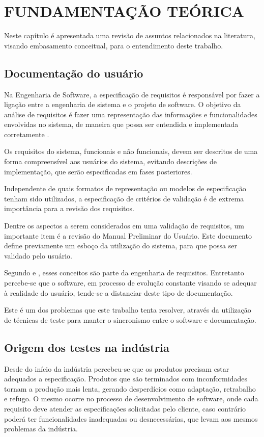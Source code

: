 \chapter{FUNDAMENTAÇÃO TEÓRICA}

Neste capítulo é apresentada uma revisão de assuntos relacionados na literatura, visando embasamento conceitual, para o entendimento deste trabalho.


\section{Documentação do usuário}

Na Engenharia de Software, a especificação de requisitos é responsável por fazer a ligação entre a engenharia de sistema e o projeto de software. O objetivo da análise de requisitos é fazer uma representação das informações e funcionalidades envolvidas no sistema, de maneira que possa ser entendida e implementada corretamente \cite{PRESSMAN}.

Os requisitos do sistema, funcionais e não funcionais, devem ser descritos de uma forma compreensível aos usuários do sistema, evitando descrições de implementação, que serão especificadas em fases posteriores.

Independente de quais formatos de representação ou modelos de especificação tenham sido utilizados, a especificação de critérios de validação é de extrema importância para a revisão dos requisitos.

Dentre os aspectos a serem considerados em uma validação de requisitos, um importante item é a revisão do Manual Preliminar do Usuário. Este documento define previamente um esboço da utilização do sistema, para que possa ser validado pelo usuário.

Segundo  e , esses conceitos são parte da engenharia de requisitos. Entretanto percebe-se que o software, em processo de evolução constante visando se adequar à realidade do usuário, tende-se a distanciar deste tipo de documentação.

Este é um dos problemas que este trabalho tenta resolver, através da utilização de técnicas de teste para manter o sincronismo entre o software e documentação.

\section{Origem dos testes na indústria}

Desde do início da indústria percebeu-se que os produtos precisam estar adequados a especificação. Produtos que são terminados com inconformidades tornam a produção mais lenta, gerando desperdícios como adaptação, retrabalho e refugo. O mesmo ocorre no processo de desenvolvimento de software, onde cada requisito deve atender as especificações solicitadas pelo cliente, caso contrário poderá ter funcionalidades inadequadas ou desnecessárias, que levam aos mesmos problemas da indústria.


